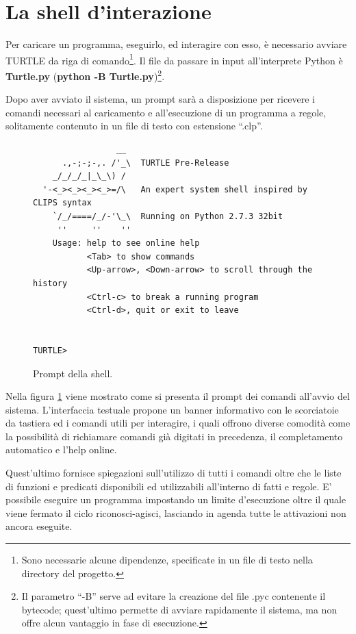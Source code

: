 \newpage
\section{La shell d'interazione}
Per caricare un programma, eseguirlo, ed interagire con esso, è necessario avviare TURTLE da riga di comando\footnote{Sono necessarie alcune dipendenze, specificate in un file di testo nella directory del progetto.}. Il file da passare in input all'interprete Python è \textbf{Turtle.py} (\textbf{python -B Turtle.py})\footnote{Il parametro ``-B'' serve ad evitare la creazione del file .pyc contenente il bytecode; quest'ultimo permette di avviare rapidamente il sistema, ma non offre alcun vantaggio in fase di esecuzione.}.

Dopo aver avviato il sistema, un prompt sarà a disposizione per ricevere i comandi necessari al caricamento e all'esecuzione di un programma a regole, solitamente contenuto in un file di testo con estensione ``.clp''.

\begin{figure}[!ht]
\centering
\begin{verbatim}
                 __
      .,-;-;-,. /'_\  TURTLE Pre-Release
    _/_/_/_|_\_\) /
  '-<_><_><_><_>=/\   An expert system shell inspired by CLIPS syntax
    `/_/====/_/-'\_\  Running on Python 2.7.3 32bit
     ''     ''    ''
    Usage: help to see online help
           <Tab> to show commands
           <Up-arrow>, <Down-arrow> to scroll through the history
           <Ctrl-c> to break a running program
           <Ctrl-d>, quit or exit to leave


TURTLE> 
\end{verbatim}
\caption{Prompt della shell.}
\label{fig:prompt}
\end{figure}

Nella figura \ref{fig:prompt} viene mostrato come si presenta il prompt dei comandi all'avvio del sistema. L'interfaccia testuale propone un banner informativo con le scorciatoie da tastiera ed i comandi utili per interagire, i quali offrono diverse comodità come la possibilità di richiamare comandi già digitati in precedenza, il completamento automatico e l'help online. 

Quest'ultimo fornisce spiegazioni sull'utilizzo di tutti i comandi oltre che le liste di funzioni e predicati disponibili ed utilizzabili all'interno di fatti e regole. E' possibile eseguire un programma impostando un limite d'esecuzione oltre il quale viene fermato il ciclo riconosci-agisci, lasciando in agenda tutte le attivazioni non ancora eseguite.

